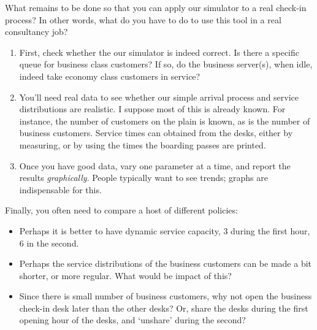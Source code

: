 \begin{exercise}
  What remains to be done so that you can  apply our simulator to a real check-in process? In other words,  what do you  have to do to use this tool in a real consultancy job?

  \begin{solution}
    \begin{enumerate}
    \item First, check whether the our simulator is indeed correct.
      Is there a specific queue for business class customers?
      If so, do the business server(s), when idle, indeed take economy class customers in service?
    \item You'll need real data to see whether our simple arrival process and service distributions are realistic.     I suppose most of this is already known. For instance, the number of customers on the plain is known, as is the number of business customers. Service times can obtained from the desks, either by measuring, or by using the times the boarding passes are printed.
    \item Once you have good data, vary one parameter at a time, and report the results \emph{graphically}.
      People typically want to see trends; graphs are indispensable for this.
    \end{enumerate}

    Finally, you often need to compare a host of different policies:
    \begin{itemize}
    \item Perhaps it is better to have  dynamic service capacity, 3 during the first hour, 6 in the second. 
    \item Perhaps the service distributions of the business customers can be made a bit shorter, or more regular. What would be impact of this? 
    \item Since there is small number of business customers, why not open the business check-in desk later than the other desks?
      Or, share the desks during the first opening hour of the desks, and `unshare' during the second?
    \end{itemize}

  \end{solution}
\end{exercise}












